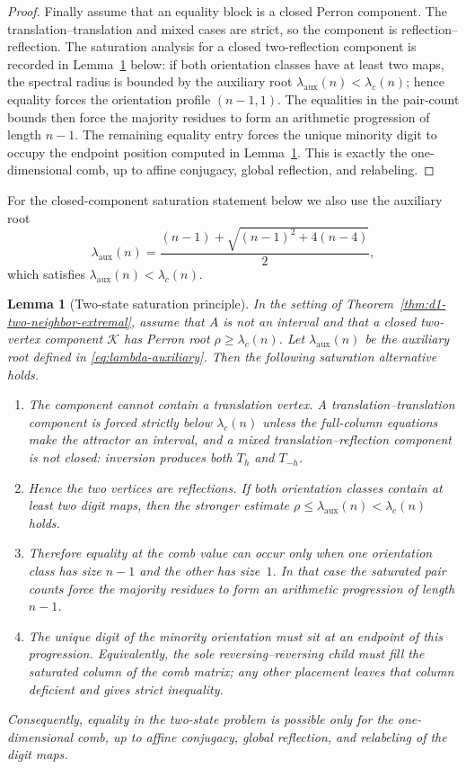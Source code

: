 \documentclass{amsart}
\newtheorem{lemma}[theorem]{Lemma}
\theoremstyle{definition}
\theoremstyle{remark}
\begin{document}
\begin{proof}
Finally assume that an equality block is a closed Perron component.  The
translation--translation and mixed cases are strict, so the component is
reflection--reflection.  The saturation analysis for a closed
two-reflection component is recorded in Lemma~\ref{lem:d1-two-state-saturation}
below: if both orientation classes have at least two maps, the spectral
radius is bounded by the auxiliary root
\(\lambda_{\mathrm{aux}}(n)<\lambda_c(n)\); hence equality forces the
orientation profile \((n-1,1)\).  The equalities in the pair-count bounds
then force the majority residues to form an arithmetic progression of
length \(n-1\).  The remaining equality entry forces the unique minority
digit to occupy the endpoint position computed in
Lemma~\ref{lem:d1-two-state-saturation}.  This is exactly the
one-dimensional comb, up to affine conjugacy, global reflection, and
relabeling.
\end{proof}

For the closed-component saturation statement below we also use the
auxiliary root
\begin{equation}\label{eq:lambda-auxiliary}
  \lambda_{\mathrm{aux}}(n)
  = \frac{(n-1)+\sqrt{(n-1)^2+4(n-4)}}{2},
\end{equation}
which satisfies \(\lambda_{\mathrm{aux}}(n)<\lambda_c(n)\).

\begin{lemma}[Two-state saturation principle]
\label{lem:d1-two-state-saturation}
In the setting of Theorem~\ref{thm:d1-two-neighbor-extremal}, assume
that $A$ is not an interval and that a closed two-vertex component
$\mathcal K$ has Perron root $\rho\ge\lambda_c(n)$.  Let
$\lambda_{\mathrm{aux}}(n)$ be the auxiliary root defined in
\eqref{eq:lambda-auxiliary}.  Then the following saturation
alternative holds.
\begin{enumerate}
\item The component cannot contain a translation vertex.  A
translation--translation component is forced strictly below
$\lambda_c(n)$ unless the full-column equations make the attractor an
interval, and a mixed translation--reflection component is not closed:
inversion produces both $T_h$ and $T_{-h}$.
\item Hence the two vertices are reflections.  If both orientation
classes contain at least two digit maps, then the stronger estimate
$\rho\le\lambda_{\mathrm{aux}}(n)<\lambda_c(n)$ holds.
\item Therefore equality at the comb value can occur only when one
orientation class has size $n-1$ and the other has size~$1$.  In that
case the saturated pair counts force the majority residues to form an
arithmetic progression of length $n-1$.
\item The unique digit of the minority orientation must sit at an
endpoint of this progression.  Equivalently, the sole
reversing--reversing child must fill the saturated column of the comb
matrix; any other placement leaves that column deficient and gives
strict inequality.
\end{enumerate}
Consequently, equality in the two-state problem is possible only for
the one-dimensional comb, up to affine conjugacy, global reflection, and
relabeling of the digit maps.
\end{lemma}
\end{document}
